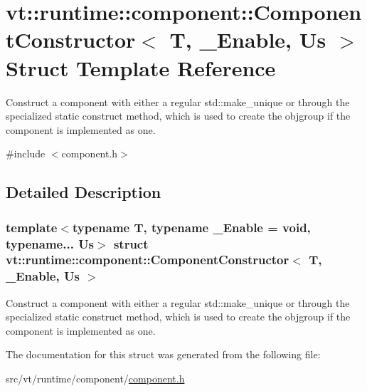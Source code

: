 \hypertarget{structvt_1_1runtime_1_1component_1_1_component_constructor}{}\section{vt\+:\+:runtime\+:\+:component\+:\+:Component\+Constructor$<$ T, \+\_\+\+Enable, Us $>$ Struct Template Reference}
\label{structvt_1_1runtime_1_1component_1_1_component_constructor}


Construct a component with either a regular {\ttfamily std\+::make\+\_\+unique} or through the specialized static {\ttfamily construct} method, which is used to create the objgroup if the component is implemented as one.  




{\ttfamily \#include $<$component.\+h$>$}



\subsection{Detailed Description}
\subsubsection*{template$<$typename T, typename \+\_\+\+Enable = void, typename... Us$>$\newline
struct vt\+::runtime\+::component\+::\+Component\+Constructor$<$ T, \+\_\+\+Enable, Us $>$}

Construct a component with either a regular {\ttfamily std\+::make\+\_\+unique} or through the specialized static {\ttfamily construct} method, which is used to create the objgroup if the component is implemented as one. 

The documentation for this struct was generated from the following file\+:\begin{DoxyCompactItemize}
\item 
src/vt/runtime/component/\hyperlink{component_8h}{component.\+h}\end{DoxyCompactItemize}
